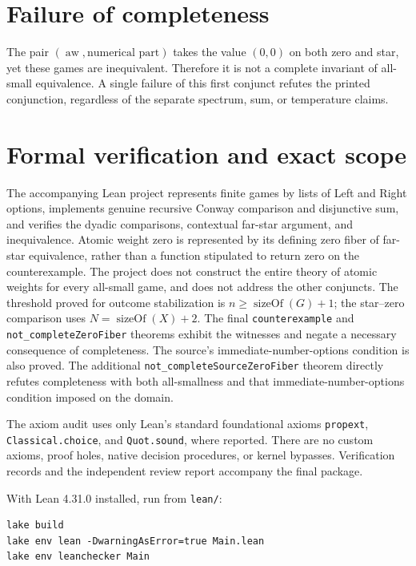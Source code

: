 \documentclass[11pt]{article}
\begin{document}
\section{Failure of completeness}
The pair $(\operatorname{aw},\text{numerical part})$ takes the value $(0,0)$ on both zero and star, yet these games are inequivalent. Therefore it is not a complete invariant of all-small equivalence. A single failure of this first conjunct refutes the printed conjunction, regardless of the separate spectrum, sum, or temperature claims.

\section{Formal verification and exact scope}
The accompanying Lean project represents finite games by lists of Left and Right options, implements genuine recursive Conway comparison and disjunctive sum, and verifies the dyadic comparisons, contextual far-star argument, and inequivalence. Atomic weight zero is represented by its defining zero fiber of far-star equivalence, rather than a function stipulated to return zero on the counterexample. The project does not construct the entire theory of atomic weights for every all-small game, and does not address the other conjuncts. The threshold proved for outcome stabilization is $n\ge\operatorname{sizeOf}(G)+1$; the star--zero comparison uses $N=\operatorname{sizeOf}(X)+2$. The final \texttt{counterexample} and \texttt{not\_completeZeroFiber} theorems exhibit the witnesses and negate a necessary consequence of completeness. The source's immediate-number-options condition is also proved. The additional \texttt{not\_completeSourceZeroFiber} theorem directly refutes completeness with both all-smallness and that immediate-number-options condition imposed on the domain.

The axiom audit uses only Lean's standard foundational axioms \texttt{propext}, \texttt{Classical.choice}, and \texttt{Quot.sound}, where reported. There are no custom axioms, proof holes, native decision procedures, or kernel bypasses. Verification records and the independent review report accompany the final package.

With Lean 4.31.0 installed, run from \texttt{lean/}:
\begin{verbatim}
lake build
lake env lean -DwarningAsError=true Main.lean
lake env leanchecker Main
\end{verbatim}
\end{document}
